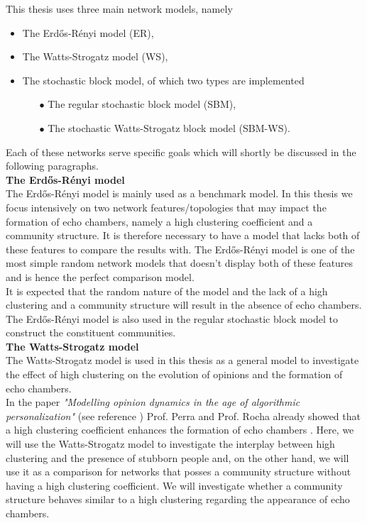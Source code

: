 \documentclass[11 pt , letterpaper , twoside , openright]{book}
\begin{document}
This thesis uses three main network models, namely
\begin{itemize}
	\item The Erd\H{o}s-R\'{e}nyi model (ER),
	\item The Watts-Strogatz model (WS),
	\item The stochastic block model, of which two types are implemented
		\begin{itemize}
			\item[\tiny$\bullet$] The regular stochastic block model (SBM),
			\item[\tiny$\bullet$] The stochastic Watts-Strogatz block model (SBM-WS).
		\end{itemize}
\end{itemize}
Each of these networks serve specific goals which will shortly be discussed in the following paragraphs.\\
\newline
\textbf{The Erd\H{o}s-R\'{e}nyi model}\\
\newline
The Erd\H{o}s-R\'{e}nyi model is mainly used as a benchmark model. In this thesis we focus intensively on two network features/topologies that may impact the formation of echo chambers, namely a high clustering coefficient and a community structure. It is therefore necessary to have a model that lacks both of these features to compare the results with. The Erd\H{o}s-R\'{e}nyi model is one of the most simple random network models that doesn't display both of these features and is hence the perfect comparison model. \\
It is expected that the random nature of the model and the lack of a high clustering and a community structure will result in the absence of echo chambers.\\
The Erd\H{o}s-R\'{e}nyi model is also used in the regular stochastic block model to construct the constituent communities.\\
\newline
\textbf{The Watts-Strogatz model}\\
\newline
The Watts-Strogatz model is used in this thesis as a general model to investigate the effect of high clustering on the evolution of opinions and the formation of echo chambers.\\
In the paper \textit{"Modelling opinion dynamics in the age of algorithmic personalization"} (see reference \cite{Perra2019}) Prof. Perra and Prof. Rocha already showed that a high clustering coefficient enhances the formation of echo chambers \cite{Perra2019}. Here, we will use the Watts-Strogatz model to investigate the interplay between high clustering and the presence of stubborn people and, on the other hand, we will use it as a comparison for networks that posses a community structure without having a high clustering coefficient. We will investigate whether a community structure behaves similar to a high clustering regarding the appearance of echo chambers.\\
\end{document}
